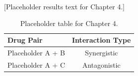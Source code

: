 [Placeholder results text for Chapter 4.]

\begin{table}[htbp]
  \centering
  \caption{Placeholder table for Chapter 4.}
  \label{tab:ch4-results}
  \begin{tabular}{lc}
    \toprule
    Drug Pair & Interaction Type \\
    \midrule
    Placeholder A + B & Synergistic \\
    Placeholder A + C & Antagonistic \\
    \bottomrule
  \end{tabular}
\end{table}
